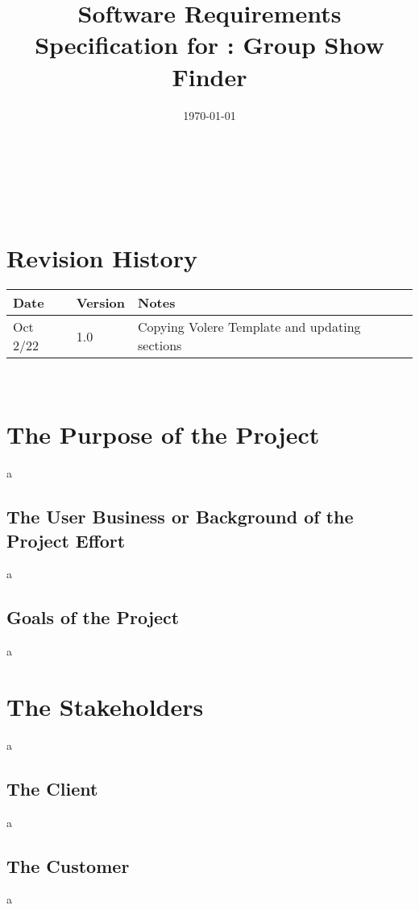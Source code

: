 \documentclass[12pt]{article}
\begin{document}
\title{Software Requirements Specification for \progname: Group Show Finder} 
\author{\authname}
\date{\today}
	
\maketitle

~\newpage {}

\tableofcontents

~\newpage

\section*{Revision History}

\begin{tabularx}{\textwidth}{p{3cm}p{2cm}X}
\toprule {\bf Date} & {\bf Version} & {\bf Notes}\\
\midrule
Oct 2/22 & 1.0 & Copying Volere Template and updating sections\\
\bottomrule
\end{tabularx}

~\newpage {}

\section{The Purpose of the Project}
a

\subsection{The User Business or Background of the Project Effort}
a

\subsection{Goals of the Project}
a

\section{The Stakeholders}
a

\subsection{The Client}
a

\subsection{The Customer}
a
\end{document}
